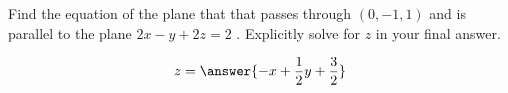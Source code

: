 \documentclass{ximera}
\author{Jim Talamo}
\begin{document}
\begin{exercise}
Find the equation of the plane that that passes through $(0,-1,1)$ and is parallel to the plane $2x-y+2z=2$ .  Explicitly solve for $z$ in your final answer.

\[
z = \answer{-x+\frac{1}{2}y+\frac{3}{2}}
\]

\end{exercise}
\end{document}
